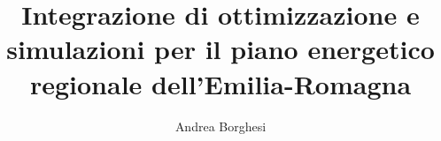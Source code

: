 \documentclass[12pt,a4paper,openright,twoside]{book}
\begin{document}
\frontmatter

\title{Integrazione di ottimizzazione e simulazioni per il piano energetico regionale dell'Emilia-Romagna}
\author{Andrea Borghesi}
\date{}

\secondreader{}			%
\thirdreader{}			%

\maketitle %
\end{document}
